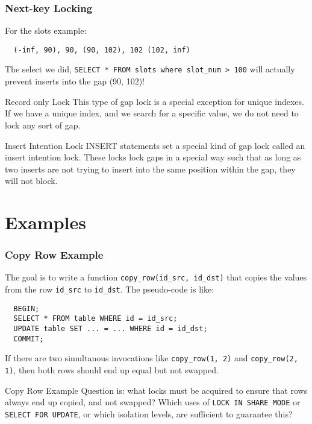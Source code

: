 \documentclass[14pt]{beamer}
\begin{document}
\begin{frame}[fragile]
  \frametitle{Next-key Locking}
  For the slots example:
  \begin{verbatim}
  (-inf, 90), 90, (90, 102), 102 (102, inf)
  \end{verbatim}
  The select we did, \texttt{SELECT * FROM slots where slot\_num > 100} will
  actually prevent inserts into the gap (90, 102)!
\end{frame}

\begin{frame}{Record only Lock}
  This type of gap lock is a special exception for unique indexes. If we have a
  unique index, and we search for a specific value, we do not need to lock any
  sort of gap.
\end{frame}

\begin{frame}{Insert Intention Lock}
  INSERT statements set a special kind of gap lock called an insert intention
  lock. These locks lock gaps in a special way such that as long as two inserts
  are not trying to insert into the same position within the gap, they will not
  block. 
\end{frame}

\section{Examples}
\begin{frame}[fragile]
  \frametitle{Copy Row Example}
  The goal is to write a function \texttt{copy\_row(id\_src, id\_dst)} that
  copies the values from the row \texttt{id\_src} to \texttt{id\_dst}. The
  pseudo-code is like:
\begin{verbatim}
  BEGIN;
  SELECT * FROM table WHERE id = id_src;
  UPDATE table SET ... = ... WHERE id = id_dst;
  COMMIT;
\end{verbatim}
  If there are two simultanous invocations like \texttt{copy\_row(1, 2)} and
  \texttt{copy\_row(2, 1)}, then both rows should end up equal but not swapped.
\end{frame}

\begin{frame}{Copy Row Example}
  Question is: what locks must be acquired to ensure that rows always end up
  copied, and not swapped?
  \newline
  \newline
  Which uses of \texttt{LOCK IN SHARE MODE} or
  \texttt{SELECT FOR UPDATE}, or which isolation levels, are sufficient to
  guarantee this?
\end{frame}
\end{document}
